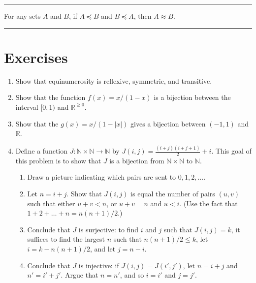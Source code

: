 \documentclass[letterpaper,10pt,english]{sphinxmanual}
\begin{document}
\bigskip\hrule\bigskip


\sphinxAtStartPar
{} For any sets \(A\) and \(B\), if \(A \preceq B\) and \(B \preceq A\), then \(A \approx B\).


\bigskip\hrule\bigskip



\section{Exercises}
\label{\detokenize{the_infinite:exercises}}\begin{enumerate}
%
\item {} 
\sphinxAtStartPar
Show that equinumerosity is reflexive, symmetric, and transitive.

\item {} 
\sphinxAtStartPar
Show that the function \(f(x) = x / (1 - x)\) is a bijection between the interval \([0,1)\) and \(\mathbb{R}^{\geq 0}\).

\item {} 
\sphinxAtStartPar
Show that the \(g(x) = x / (1 - |x|)\) gives a bijection between \((-1, 1)\) and \(\mathbb{R}\).

\item {} 
\sphinxAtStartPar
Define a function \(J : \mathbb{N} \times \mathbb{N} \to \mathbb{N}\) by \(J(i,j) = \frac{(i + j)(i + j + 1)}{2} + i\). This goal of this problem is to show that \(J\) is a bijection from \(\mathbb{N} \times \mathbb{N}\) to \(\mathbb{N}\).
\begin{enumerate}
%
\item {} 
\sphinxAtStartPar
Draw a picture indicating which pairs are sent to \(0, 1, 2, \ldots\).

\item {} 
\sphinxAtStartPar
Let \(n = i + j\). Show that \(J(i,j)\) is equal the number of pairs \((u, v)\) such that either \(u + v < n\), or \(u + v = n\) and \(u < i\). (Use the fact that \(1 + 2 + \ldots + n = n(n+1)/2\).)

\item {} 
\sphinxAtStartPar
Conclude that \(J\) is surjective: to find \(i\) and \(j\) such that \(J(i,j) = k\), it suffices to find the largest \(n\) such that \(n(n+1)/2 \leq k\), let \(i = k - n(n+1)/2\), and let \(j = n - i\).

\item {} 
\sphinxAtStartPar
Conclude that \(J\) is injective: if \(J(i,j) = J(i',j')\), let \(n = i + j\) and \(n' = i' + j'\). Argue that \(n = n'\), and so \(i = i'\) and \(j = j'\).


\end{enumerate}
\end{enumerate}
\end{document}
